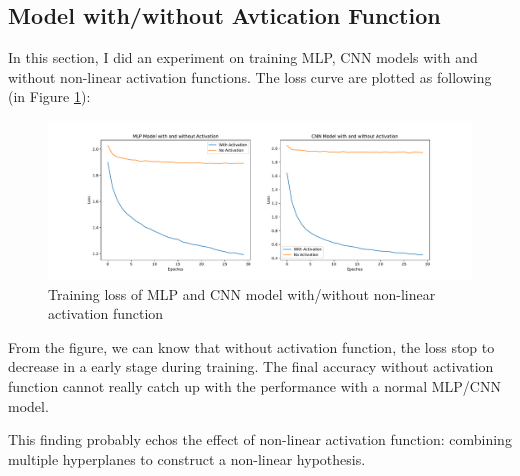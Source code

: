 \documentclass[12pt,letterpaper]{article}
\begin{document}
\subsection*{Model with/without Avtication Function}
In this section, I did an experiment on training MLP, CNN models with and without non-linear activation functions. The loss curve are plotted as following (in Figure \ref{fig:activation}):

\begin{figure}[h]
  \centering
  \includegraphics[width=\textwidth]{Activation_NO_Activation.pdf}
  \caption[]{Training loss of MLP and CNN model with/without non-linear activation function}
  \label{fig:activation}
\end{figure}

From the figure, we can know that without activation function, the loss stop to decrease in a early stage during training. The final accuracy without activation function cannot really catch up with the performance with a normal MLP/CNN model.

This finding probably echos the effect of non-linear activation function: combining multiple hyperplanes to construct a non-linear hypothesis.
\end{document}
